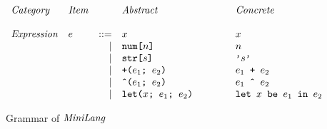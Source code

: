 \begin{figure}[H]
\[
\begin{array}{llrl@{\hspace{1.5cm}}l}
\mathit{Category}   & \mathit{Item}   & & \mathit{Abstract} & \mathit{Concrete} \\ \\
\mathit{Expression} & e & \bnfdef & x                              & x \\
                    &   & \bnfalt & \code{num[$n$]}                & n \\
                    &   & \bnfalt & \code{str[$s$]}                & \code{'$s$'} \\
                    &   & \bnfalt & \code{+($e_1$; $e_2$)}         & \code{$e_1$ + $e_2$} \\
                    &   & \bnfalt & \code{\^{}($e_1$; $e_2$)}      & \code{$e_1$ \^{} $e_2$} \\
                    &   & \bnfalt & \code{let($x$; $e_1$; $e_2$)}  & \code{let $x$ be $e_1$ in $e_2$}
\end{array}
\]
\caption{Grammar of $\mathit{MiniLang}$}
\label{fig:grammar}
\end{figure}
